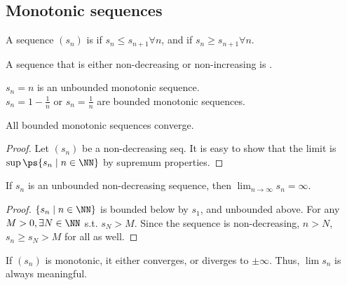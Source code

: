 \documentclass[11pt]{scrartcl}
\numberwithin{equation}{section}
\begin{document}
\subsection{Monotonic sequences}
\begin{definition}
    A sequence $(s_n)$ is  if $s_n\leq s_{n+1} \forall n$,
    and  if $s_n\geq s_{n+1} \forall n$.

    A sequence that is either non-decreasing or non-increasing is
    .
\end{definition}
\begin{example}
    $s_n=n$ is an unbounded monotonic sequence. \\
    $s_n=1-\frac{1}{n}$ or $s_n=\frac{1}{n}$ are bounded monotonic sequences.
\end{example}

\begin{theorem}
    \label{thm:bddmonotonicconv}
    All bounded monotonic sequences converge.
\end{theorem}

\begin{proof}
    Let $(s_n)$ be a non-decreasing seq.
    It is easy to show that the limit is $\sup\ps{s_n\mid n\in \NN}$
    by supremum properties.
\end{proof}

\begin{proposition}
    If $s_n$ is an unbounded non-decreasing sequence, then 
    $\lim_{n\rightarrow\infty} s_n = \infty$.
\end{proposition}
\begin{proof}
    $\left\{s_n\mid n\in\NN\right\}$ is bounded below by $s_1$,
    and unbounded above. For any $M>0, \exists N\in\NN$ s.t.
    $s_N>M$. Since the sequence is non-decreasing, 
    $n>N$, $s_n\geq s_N>M$ for all  as well.
\end{proof}
\begin{corollary}
    If $(s_n)$ is monotonic, it either converges, or diverges to $\pm\infty$.
    Thus, $\lim s_n$ is always meaningful.
\end{corollary}
\end{document}

